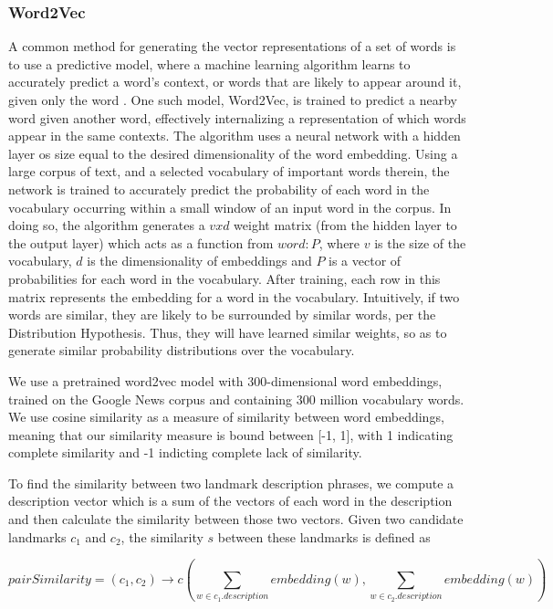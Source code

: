 \subsubsection{Word2Vec}
A common method for generating the vector representations of a set of words is to use a predictive model, where a machine learning algorithm learns to accurately predict a word's context, or words that are likely to appear around it, given only the word \cite{baroni2014don}. One such model, Word2Vec, \cite{mikolov2013efficient} is trained to predict a nearby word given another word, effectively internalizing a representation of which words appear in the same contexts. The algorithm uses a neural network with a hidden layer os size equal to the desired dimensionality of the word embedding.  Using a large corpus of text, and a selected vocabulary of important words therein, the network is trained to accurately predict the probability of each word in the vocabulary occurring within a small window of an input word in the corpus. In doing so, the algorithm generates a $v x d$ weight matrix (from the hidden layer to the output layer) which acts as a function from $word : P$, where $v$ is the size of the vocabulary, $d$ is the dimensionality of embeddings and $P$ is a vector of probabilities for each word in the vocabulary. After training, each row in this matrix represents the embedding for a word in the vocabulary. Intuitively, if two words are similar, they are likely to be surrounded by similar words, per the Distribution Hypothesis. Thus, they will have learned similar weights, so as to generate similar probability distributions over the vocabulary.

We use a pretrained word2vec model \cite{word2vec} with 300-dimensional word embeddings, trained on the Google News corpus and containing 300 million vocabulary words. We use cosine similarity as a measure of similarity between word embeddings, meaning that our similarity measure is bound between [-1, 1], with 1 indicating complete similarity and -1 indicting complete lack of similarity. 

To find the similarity between two landmark description phrases, we compute a description vector which is a sum of the vectors of each word in the description and then calculate the similarity between those two vectors. Given two candidate landmarks $c_1$ and $c_2$, the similarity $s$ between these landmarks is defined as

\begin{equation}\label{eq:landmrkSimilarity}
    pairSimilarity = (c_1, c_2) \longrightarrow c(\sum\limits_{w \in c_1.description} embedding(w), \sum\limits_{w \in c_2.description} embedding(w))
\end{equation}

